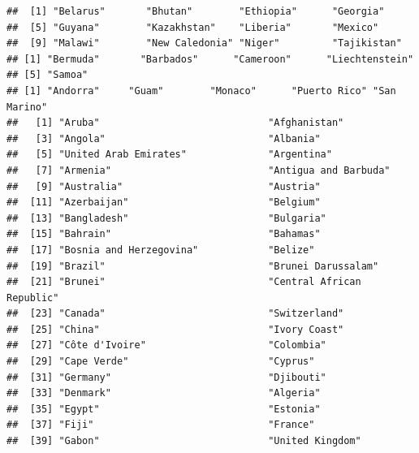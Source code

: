 \documentclass[]{article}
\newenvironment{Shaded}{\begin{snugshade}}{\end{snugshade}}
\newcommand{\ControlFlowTok}[1]{\textcolor[rgb]{0.13,0.29,0.53}{\textbf{#1}}}
\newcommand{\DecValTok}[1]{\textcolor[rgb]{0.00,0.00,0.81}{#1}}
\newcommand{\KeywordTok}[1]{\textcolor[rgb]{0.13,0.29,0.53}{\textbf{#1}}}
\newcommand{\NormalTok}[1]{#1}
\newcommand{\OperatorTok}[1]{\textcolor[rgb]{0.81,0.36,0.00}{\textbf{#1}}}
\newcommand{\StringTok}[1]{\textcolor[rgb]{0.31,0.60,0.02}{#1}}
\begin{document}
\begin{Shaded}
\end{Shaded}

\begin{verbatim}
##  [1] "Belarus"       "Bhutan"        "Ethiopia"      "Georgia"      
##  [5] "Guyana"        "Kazakhstan"    "Liberia"       "Mexico"       
##  [9] "Malawi"        "New Caledonia" "Niger"         "Tajikistan"   
## [1] "Bermuda"       "Barbados"      "Cameroon"      "Liechtenstein"
## [5] "Samoa"        
## [1] "Andorra"     "Guam"        "Monaco"      "Puerto Rico" "San Marino" 
##   [1] "Aruba"                             "Afghanistan"                      
##   [3] "Angola"                            "Albania"                          
##   [5] "United Arab Emirates"              "Argentina"                        
##   [7] "Armenia"                           "Antigua and Barbuda"              
##   [9] "Australia"                         "Austria"                          
##  [11] "Azerbaijan"                        "Belgium"                          
##  [13] "Bangladesh"                        "Bulgaria"                         
##  [15] "Bahrain"                           "Bahamas"                          
##  [17] "Bosnia and Herzegovina"            "Belize"                           
##  [19] "Brazil"                            "Brunei Darussalam"                
##  [21] "Brunei"                            "Central African Republic"         
##  [23] "Canada"                            "Switzerland"                      
##  [25] "China"                             "Ivory Coast"                      
##  [27] "Côte d'Ivoire"                     "Colombia"                         
##  [29] "Cape Verde"                        "Cyprus"                           
##  [31] "Germany"                           "Djibouti"                         
##  [33] "Denmark"                           "Algeria"                          
##  [35] "Egypt"                             "Estonia"                          
##  [37] "Fiji"                              "France"                           
##  [39] "Gabon"                             "United Kingdom"                   

\end{verbatim}
\end{document}
